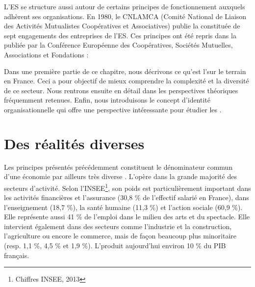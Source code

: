 L’ES se structure aussi autour de certains principes de fonctionnement auxquels adhèrent ses organisations. En 1980, le CNLAMCA (Comité National de Liaison des Activités Mutualistes Coopératives et Associatives) publie la  constituée de sept engagements des entreprises de l’ES. Ces principes ont été repris dans la  publiée par la Conférence Européenne des Coopératives, Sociétés Mutuelles, Associations et Fondations \parencite{monzon_campos2012social} :
\begin{quotation}
\end{quotation}

Dans une première partie de ce chapitre, nous décrivons ce qu'est l'\ess sur le terrain en France. Ceci a pour objectif de mieux comprendre la complexité et la diversité de ce secteur. Nous rentrons ensuite en détail dans les perspectives théoriques fréquemment retenues. Enfin, nous introduisons le concept d'identité organisationnelle qui offre une perspective intéressante pour étudier les \eess.

\section{Des réalités diverses}

    Les principes présentés précédemment constituent le dénominateur commun d’une économie par ailleurs très diverse \parencite{mariaux2015leconomie}. L’\ess opère dans la grande majorité des secteurs d’activité. Selon l’INSEE\footnote{Chiffres INSEE, 2013}, son poids est particulièrement important dans les activités financières et l’assurance (30,8 \% de l’effectif salarié en France), dans l’enseignement (18,7 \%), la santé humaine (11,3 \%) et l’action sociale (60,9 \%). Elle représente aussi 41 \% de l’emploi dans le milieu des arts et du spectacle. Elle intervient également dans des secteurs comme l’industrie et la construction, l’agriculture ou encore le commerce, mais de façon beaucoup plus minoritaire (resp. 1,1 \%, 4,5 \% et 1,9 \%). L’\ess produit aujourd’hui environ 10 \% du PIB français. \\


